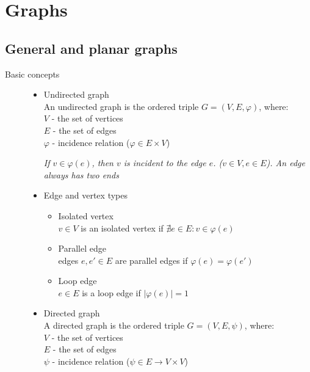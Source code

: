 \documentclass[margin=0px]{article}
\begin{document}
\section{Graphs}
\subsection{General and planar graphs}
\begin{description}
    \item[Basic concepts] \hfill
        \begin{itemize}
            \item Undirected graph\\
                  An undirected graph is the ordered triple $G = (V,E, \varphi)$, where:\\
                  $V$ - the set of vertices \\
                  $E$ - the set of edges \\
                  $\varphi$ - incidence relation ($\varphi \in E \times V$)

                  \textit{If $v\in\varphi(e)$, then $v$ is incident to the edge $e$. ($v\in V, e\in E$). An edge always has two ends}

            \item Edge and vertex types
                  \begin{itemize}
                      \item Isolated vertex \\
                            $v\in V$ is an isolated vertex if $\nexists e \in E: v\in \varphi(e)$
                      \item Parallel edge \\
                            edges $e,e'\in E$ are parallel edges if $\varphi(e) = \varphi(e')$
                      \item Loop edge \\
                            $e\in E$ is a loop edge if $|\varphi(e) | = 1$
                  \end{itemize}
            \item Directed graph \\
                  A directed graph is the ordered triple $G = (V,E, \psi)$, where:\\
                  $V$ - the set of vertices \\
                  $E$ - the set of edges \\
                  $\psi$ - incidence relation ($\psi \in E \rightarrow V \times V$)


\end{itemize}
\end{description}
\end{document}
